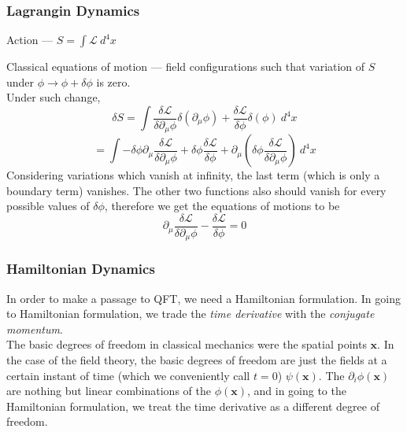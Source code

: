 \documentclass[11pt]{article}
\newcommand{\del}{\partial}
\newcommand{\ld}{\mathcal{L}}
\numberwithin{equation}{section}
\begin{document}
    \subsubsection{Lagrangin Dynamics}
    Action — \(S = \int \ld~d^4x\)
    \begin{center}
    \end{center}
    Classical equations of motion — field configurations such that variation of \(S\) under \(\phi \to \phi + \delta\phi\) is zero. \\
    Under such change, 
    \begin{equation*}
        \delta S = \int \frac{\delta \ld}{\delta \del_\mu \phi}\delta(\del_\mu \phi) + \frac{\delta \ld}{\delta \phi}\delta(\phi) ~d^4x
    \end{equation*}
    \begin{equation}
        = \int -\delta\phi \del_\mu\frac{\delta \ld}{\delta \del_\mu \phi} + \delta\phi\frac{\delta \ld}{\delta \phi} + \del_\mu \left( \delta\phi \frac{\delta \ld}{\delta \del_\mu \phi} \right)~d^4x  
    \end{equation}
    Considering variations which vanish at infinity, the last term (which is only a boundary term) vanishes. The other two functions also should vanish for every possible values of \(\delta \phi\), therefore we get the equations of motions to be 
    \begin{equation}
        \del_\mu\frac{\delta \ld}{\delta \del_\mu \phi} - \frac{\delta \ld}{\delta \phi} = 0
    \end{equation}

    \subsubsection{Hamiltonian Dynamics}
    In order to make a passage to QFT, we need a Hamiltonian formulation. In going to Hamiltonian formulation, we trade the \textit{time derivative} with the \textit{conjugate momentum}.\\

    The basic degrees of freedom in classical mechanics were the spatial points \(\textbf{x}\). In the case of the field theory, the basic degrees of freedom are just the fields at a certain instant of time (which we conveniently call \(t=0\)) \(\psi(\textbf{x})\). The \(\del_i \phi(\textbf{x})\) are nothing but linear combinations of the \(\phi(\textbf{x})\), and in going to the Hamiltonian formulation, we treat the time derivative as a different degree of freedom.
\end{document}
